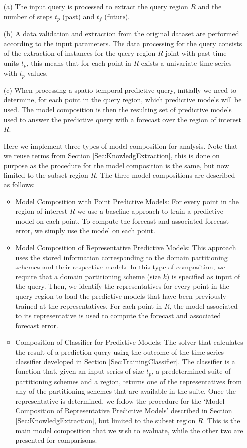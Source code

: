 \begin{itemize}
 \item [(a)] The input query is processed to extract the query region $R$ and the number of steps $t_p$ (past) and $t_f$ (future).
 \item [(b)] A data validation and extraction from the original dataset are performed according to the input parameters. The data processing for the query consists of the extraction of instances for the query region $R$ joint with past time units $t_{p}$, this means that for each point in $R$ exists a univariate time-series with $t_{p}$ values.
 \item [(c)] When processing a spatio-temporal predictive query, initially we need to determine, for each point in the query region, which predictive models will be used. The model composition is then the resulting set of predictive models used to answer the predictive query with a forecast over the region of interest $R$. 
 
 Here we implement three types of model composition for analysis. Note that we reuse terms from Section \ref{Sec:KnowledgExtraction}, this is done on purpose as the procedure for the model composition is the same, but now limited to the subset region $R$. The three model compositions are described as follows:

 \begin{itemize}
	\item Model Composition with Point Predictive Models: For every point in the region of interest $R$ we use a baseline approach to train a predictive model on each point. To compute the forecast and associated forecast error, we simply use the model on each point.

	\item Model Composition of Representative Predictive Models: This approach uses the stored information corresponding to the domain partitioning schemes and their respective models. In this type of composition, we require that a domain partitioning scheme (size $k$) is specified as input of the query. Then, we identify the representatives for every point in the query region to load the predictive models that have been previously trained at the representatives. For each point in $R$, the model associated to its representative is used to compute the forecast and associated forecast error.
	
	\item Composition of Classifier for Predictive Models: The solver that calculates the result of a prediction query using the outcome of the time series classifier developed in Section \ref{Sec:TrainingClassifier}. The classifier is a function that, given an input series of size $t_p$, a predetermined suite of partitioning schemes and a region, returns one of the representatives from any of the partitioning schemes that are available in the suite. Once the representative is determined, we follow the procedure for the `Model Composition of Representative Predictive Models' described in Section \ref{Sec:KnowledgExtraction}, but limited to the subset region $R$. This is the main model composition that we wish to evaluate, while the other two are presented for comparisons.
 \end{itemize}
 

\end{itemize}
